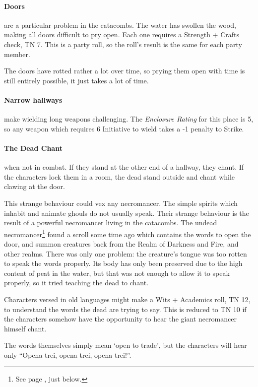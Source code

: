 \begin{multicols}{2}
\paragraph{Doors} are a particular problem in the catacombs.  The water has swollen the wood, making all doors difficult to pry open.  Each one requires a Strength + Crafts check, TN 7.  This is a party roll, so the roll's result is the same for each party member.

The doors have rotted rather a lot over time, so prying them open with time is still entirely possible, it just takes a lot of time.

\paragraph{Narrow hallways}
make wielding long weapons challenging.
The \textit{Enclosure Rating} for this place is 5, so any weapon which requires 6 Initiative to wield takes a -1 penalty to Strike.

\paragraph{The Dead Chant} when not in combat.
If they stand at the other end of a hallway, they chant.
If the characters lock them in a room, the dead stand outside and chant while clawing at the door.

This strange behaviour could vex any necromancer.
The simple spirits which inhabit and animate ghouls do not usually speak.
Their strange behaviour is the result of a powerful necromancer living in the catacombs.
The undead necromancer\footnote{See page \pageref{undead_ogre}, just below.} found a scroll some time ago which contains the words to open the door, and summon creatures back from the Realm of Darkness and Fire, and other realms.
There was only one problem: the creature's tongue was too rotten to speak the words properly.
Its body has only been preserved due to the high content of peat in the water, but that was not enough to allow it to speak properly, so it tried teaching the dead to chant.

Characters versed in old languages might make a Wits + Academics roll, TN 12, to understand the words the dead are trying to say.  This is reduced to TN 10 if the characters somehow have the opportunity to hear the giant necromancer himself chant.

The words themselves simply mean `open to trade', but the characters will hear only ``Opena trei, opena trei, opena trei!''.


\end{multicols}
